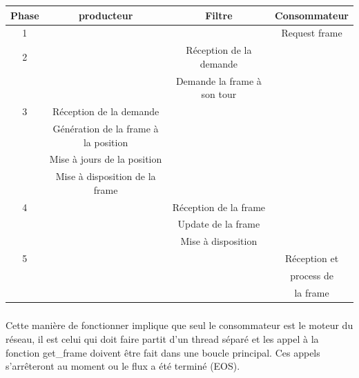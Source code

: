 \begin{center}

  \begin{tabular}{ | c | c | c | c |}

    \hline

      Phase & producteur              & Filtre                      &
      Consommateur    \\ \hline \hline

      1     &                         &                             &
      Request frame   \\ \hline 2     &                         &
      Réception de la demande     &                 \\
            &                         & Demande la frame à son tour&
            \\ \hline
      3     & Réception de la demande &                             & \\
            & Génération de la frame à la position &                &
            \\ & Mise à jours de la position          &                &
            \\ & Mise à disposition de la frame       &                &
            \\ \hline
      4     &                         & Réception de la frame       & \\
            &                         & Update de la frame          & \\ &
            & Mise à disposition          & \\ \hline
      5     &                         &                             &
      Réception et    \\
            &                         &                             &
            process de      \\ &                         & & la
            frame        \\

    \hline

  \end{tabular}

\end{center}

\subparagraph{}

Cette manière de fonctionner implique que seul le consommateur est
le moteur du réseau, il est celui qui doit faire partit d'un thread
séparé et les appel à la fonction get\_frame doivent être fait dans
une boucle principal.  Ces appels s'arrêteront au moment ou le flux a
été terminé (EOS).


